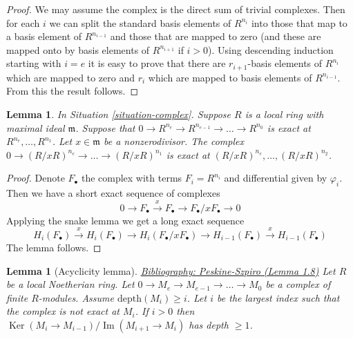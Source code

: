 \documentclass{amsart}
\newenvironment{reference}{\comment}{\endcomment}
\theoremstyle{plain}
\newtheorem{lemma}[subsection]{Lemma}
\theoremstyle{definition}
\theoremstyle{remark}
\numberwithin{equation}{subsection}
\def\Ker{\mathop{\mathrm{Ker}}}
\def\Im{\mathop{\mathrm{Im}}}
\begin{document}
\begin{proof}
We may assume the complex is the direct sum of trivial
complexes. Then for each $i$ we can split the standard basis
elements of $R^{n_i}$ into those that map to a basis element
of $R^{n_{i-1}}$ and those that are mapped to zero (and these
are mapped onto by basis elements of $R^{n_{i + 1}}$ if $i > 0$).
Using descending
induction starting with $i = e$ it is easy to prove that there
are $r_{i + 1}$-basis elements of $R^{n_i}$ which are mapped
to zero and $r_i$ which are mapped to basis elements of
$R^{n_{i-1}}$. From this the result follows.
\end{proof}


\begin{lemma}
\label{lemma-div-x-exact-one-less}
In Situation \ref{situation-complex}. Suppose $R$ is
a local ring with maximal ideal $\mathfrak m$.
Suppose that $0 \to R^{n_e} \to R^{n_{e-1}} \to \ldots \to R^{n_0}$
is exact at $R^{n_e}, \ldots, R^{n_1}$.
Let $x \in \mathfrak m$ be a nonzerodivisor. The complex
$0 \to (R/xR)^{n_e} \to \ldots \to (R/xR)^{n_1}$
is exact at $(R/xR)^{n_e}, \ldots, (R/xR)^{n_2}$.
\end{lemma}

\begin{proof}
Denote $F_\bullet$ the complex with terms $F_i = R^{n_i}$
and differential given by $\varphi_i$. Then we have a short
exact sequence of complexes
$$
0 \to F_\bullet \xrightarrow{x} F_\bullet \to F_\bullet/xF_\bullet \to 0
$$
Applying the snake lemma we get a long exact sequence
$$
H_i(F_\bullet) \xrightarrow{x} H_i(F_\bullet) \to
H_i(F_\bullet/xF_\bullet) \to H_{i - 1}(F_\bullet)
\xrightarrow{x} H_{i - 1}(F_\bullet)
$$
The lemma follows.
\end{proof}


\begin{lemma}[Acyclicity lemma]
\label{lemma-acyclic}
\begin{reference}
\href{https://stacks.math.columbia.edu/bibliography}{Bibliography: Peskine-Szpiro (Lemma 1.8)}
\end{reference}
Let $R$ be a local Noetherian ring.
Let $0 \to M_e \to M_{e-1} \to \ldots \to M_0$
be a complex of finite $R$-modules.
Assume $\text{depth}(M_i) \geq i$.
Let $i$ be the largest index such that the complex is
not exact at $M_i$. If $i > 0$ then
$\Ker(M_i \to M_{i-1})/\Im(M_{i + 1} \to M_i)$
has depth $\geq 1$.
\end{lemma}
\end{document}
